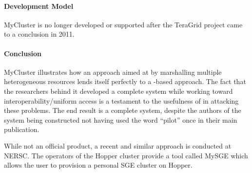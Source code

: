 \documentclass{sig-alternate}
\begin{document}
\paragraph{Development Model}
MyCluster is no longer developed or supported after the TeraGrid project came
to a conclusion in 2011.

\paragraph{Conclusion}
MyCluster illustrates how an approach aimed at 
by marshalling multiple heterogeneous resources lends itself perfectly to a
\pilot-based approach.
The fact that the researchers behind it developed a complete \pilot system
while working toward interoperability/uniform access is a testament to the
usefulness of \pilots in attacking these problems.
The end result is a complete \pilot system, despite the authors of the system
being constructed not having used the word ``pilot'' once in their main
publication.

While not an official product, a recent and similar approach is conducted at
NERSC. The operators of the Hopper cluster provide a tool called MySGE which
allows the user to provision a personal SGE cluster on Hopper.


%
%
\subsubsection{\panda}
\label{sec:panda}
\end{document}
